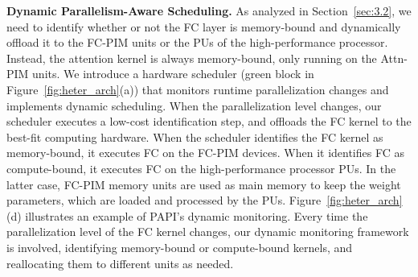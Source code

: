 \noindent\textbf{Dynamic Parallelism-Aware Scheduling.}
As analyzed in Section~\ref{sec:3.2}, we need to identify whether or not the FC layer is memory-bound and dynamically offload it to the FC-PIM units or the PUs of the high-performance processor. Instead, the attention kernel is always memory-bound, only running on the Attn-PIM units. 
We introduce a hardware scheduler (green block in Figure~\ref{fig:heter_arch}(a)) that monitors runtime parallelization changes and implements dynamic scheduling. When the parallelization level changes, our scheduler executes a low-cost identification step, and offloads the FC kernel to the best-fit computing hardware. 
When the scheduler identifies the FC kernel as memory-bound, it executes FC on the FC-PIM devices. When it identifies FC as compute-bound, it executes FC on the high-performance processor PUs. In the latter case, FC-PIM memory units are used as main memory to keep the weight parameters, which are loaded and processed by the PUs. 
Figure~\ref{fig:heter_arch}(d) illustrates an example of PAPI's dynamic monitoring. Every time the parallelization level of the FC kernel changes, our dynamic monitoring framework is involved, identifying memory-bound or compute-bound kernels, and reallocating them to different units as needed.

